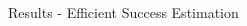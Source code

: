 \documentclass{dfki}
\begin{document}
\begin{frame}{Results - Efficient Success Estimation}
{\begin{textblock*}{7.5cm}
		\end{textblock*}
		}
\end{frame}
\end{document}
